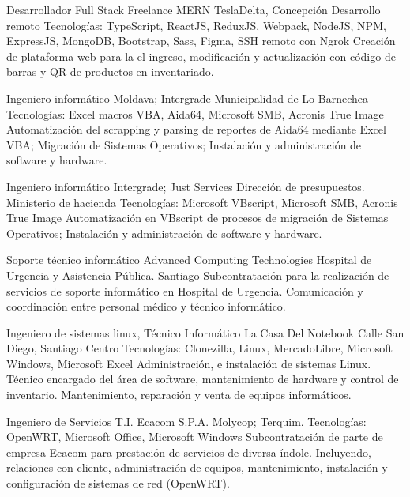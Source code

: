 \documentclass[draft,color,12pt,letterpaper,sans]{moderncv}
\begin{document}
{Desarrollador Full Stack Freelance MERN}
{TeslaDelta, Concepción}
{\newline Desarrollo remoto}
{\newline Tecnologías: TypeScript, ReactJS, ReduxJS, Webpack, NodeJS, NPM, ExpressJS, MongoDB, Bootstrap, Sass, Figma, SSH remoto con Ngrok}
{Creación de plataforma web para la el ingreso, modificación y actualización con código de barras y QR de productos en inventariado.\newline}

{Ingeniero informático}
{Moldava; Intergrade}
{Municipalidad de Lo Barnechea}
{\newline Tecnologías: Excel macros VBA, Aida64, Microsoft SMB, Acronis True Image}
{Automatización del scrapping y parsing de reportes de Aida64 mediante Excel VBA; Migración de Sistemas Operativos; Instalación y administración de software y hardware.\newline}


{Ingeniero informático}
{Intergrade; Just Services}
{Dirección de presupuestos. Ministerio de hacienda}
{\newline Tecnologías: Microsoft VBscript, Microsoft SMB, Acronis True Image}
{Automatización en VBscript de procesos de migración de Sistemas Operativos; Instalación y administración de software y hardware.\newline}

{Soporte técnico informático}
{Advanced Computing Technologies}
{Hospital de Urgencia y Asistencia Pública. Santiago}
{}
{Subcontratación para la realización de servicios de soporte informático en Hospital de Urgencia. Comunicación y coordinación entre personal médico y técnico informático.\newline}

{Ingeniero de sistemas linux, Técnico Informático}
{La Casa Del Notebook}
{Calle San Diego, Santiago Centro}
{\newline Tecnologías: Clonezilla, Linux, MercadoLibre, Microsoft Windows, Microsoft Excel}
{Administración, e instalación de sistemas Linux. Técnico encargado del área de software, mantenimiento de hardware y control de inventario. Mantenimiento, reparación y venta de equipos informáticos.\newline} 

{Ingeniero de Servicios T.I.}
{Ecacom S.P.A.}
{Molycop; Terquim. }
{\newline Tecnologías: OpenWRT, Microsoft Office, Microsoft Windows}
{Subcontratación de parte de empresa Ecacom para prestación de servicios de diversa índole. Incluyendo, relaciones con cliente, administración de equipos, mantenimiento, instalación y configuración de sistemas de red (OpenWRT).\newline}
\end{document}
